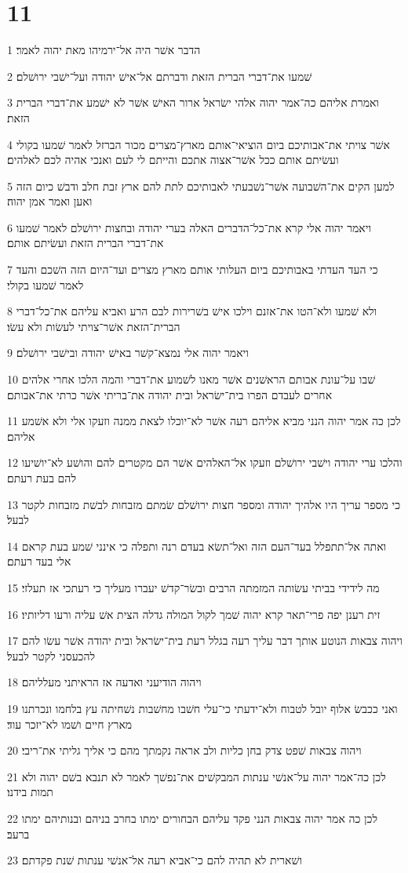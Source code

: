 \chapter{11}

\par 1 הדבר אשׁר היה אל־ירמיהו מאת יהוה לאמר׃
\par 2 שׁמעו את־דברי הברית הזאת ודברתם אל־אישׁ יהודה ועל־ישׁבי ירושׁלם׃
\par 3 ואמרת אליהם כה־אמר יהוה אלהי ישׂראל ארור האישׁ אשׁר לא ישׁמע את־דברי הברית הזאת׃
\par 4 אשׁר צויתי את־אבותיכם ביום הוציאי־אותם מארץ־מצרים מכור הברזל לאמר שׁמעו בקולי ועשׂיתם אותם ככל אשׁר־אצוה אתכם והייתם לי לעם ואנכי אהיה לכם לאלהים׃
\par 5 למען הקים את־השׁבועה אשׁר־נשׁבעתי לאבותיכם לתת להם ארץ זבת חלב ודבשׁ כיום הזה ואען ואמר אמן יהוה׃
\par 6 ויאמר יהוה אלי קרא את־כל־הדברים האלה בערי יהודה ובחצות ירושׁלם לאמר שׁמעו את־דברי הברית הזאת ועשׂיתם אותם׃
\par 7 כי העד העדתי באבותיכם ביום העלותי אותם מארץ מצרים ועד־היום הזה השׁכם והעד לאמר שׁמעו בקולי׃
\par 8 ולא שׁמעו ולא־הטו את־אזנם וילכו אישׁ בשׁרירות לבם הרע ואביא עליהם את־כל־דברי הברית־הזאת אשׁר־צויתי לעשׂות ולא עשׂו׃
\par 9 ויאמר יהוה אלי נמצא־קשׁר באישׁ יהודה ובישׁבי ירושׁלם׃
\par 10 שׁבו על־עונת אבותם הראשׁנים אשׁר מאנו לשׁמוע את־דברי והמה הלכו אחרי אלהים אחרים לעבדם הפרו בית־ישׂראל ובית יהודה את־בריתי אשׁר כרתי את־אבותם׃
\par 11 לכן כה אמר יהוה הנני מביא אליהם רעה אשׁר לא־יוכלו לצאת ממנה וזעקו אלי ולא אשׁמע אליהם׃
\par 12 והלכו ערי יהודה וישׁבי ירושׁלם וזעקו אל־האלהים אשׁר הם מקטרים להם והושׁע לא־יושׁיעו להם בעת רעתם׃
\par 13 כי מספר עריך היו אלהיך יהודה ומספר חצות ירושׁלם שׂמתם מזבחות לבשׁת מזבחות לקטר לבעל׃
\par 14 ואתה אל־תתפלל בעד־העם הזה ואל־תשׂא בעדם רנה ותפלה כי אינני שׁמע בעת קראם אלי בעד רעתם׃
\par 15 מה לידידי בביתי עשׂותה המזמתה הרבים ובשׂר־קדשׁ יעברו מעליך כי רעתכי אז תעלזי׃
\par 16 זית רענן יפה פרי־תאר קרא יהוה שׁמך לקול המולה גדלה הצית אשׁ עליה ורעו דליותיו׃
\par 17 ויהוה צבאות הנוטע אותך דבר עליך רעה בגלל רעת בית־ישׂראל ובית יהודה אשׁר עשׂו להם להכעסני לקטר לבעל׃
\par 18 ויהוה הודיעני ואדעה אז הראיתני מעלליהם׃
\par 19 ואני ככבשׂ אלוף יובל לטבוח ולא־ידעתי כי־עלי חשׁבו מחשׁבות נשׁחיתה עץ בלחמו ונכרתנו מארץ חיים ושׁמו לא־יזכר עוד׃
\par 20 ויהוה צבאות שׁפט צדק בחן כליות ולב אראה נקמתך מהם כי אליך גליתי את־ריבי׃
\par 21 לכן כה־אמר יהוה על־אנשׁי ענתות המבקשׁים את־נפשׁך לאמר לא תנבא בשׁם יהוה ולא תמות בידנו׃
\par 22 לכן כה אמר יהוה צבאות הנני פקד עליהם הבחורים ימתו בחרב בניהם ובנותיהם ימתו ברעב׃
\par 23 ושׁארית לא תהיה להם כי־אביא רעה אל־אנשׁי ענתות שׁנת פקדתם׃


